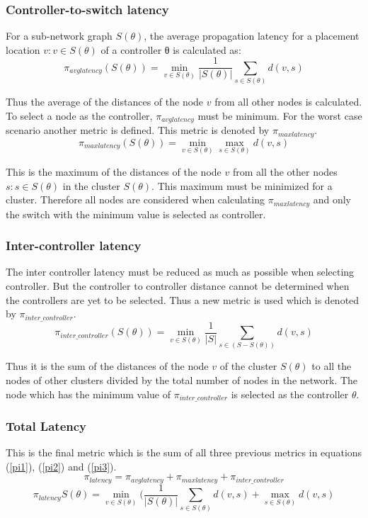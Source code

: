 \documentclass[10pt]{extarticle}
\begin{document}
	\subsubsection{Controller-to-switch latency}
	For a sub-network graph $S(\theta)$, the average propagation latency for a placement location $v:v\in S(\theta)$ of a controller θ is calculated as:
	\begin{equation}	\label{pi1}
	\pi_{avglatency}(S(\theta)) = \min_{v\in S(\theta)} \frac{1}{|S(\theta)|} \sum_{s\in S(\theta)}d(v,s)
	\end{equation}
	
	Thus the average of the distances of the node $v$ from all other nodes is calculated. To select a node as the controller, $\pi_{avglatency}$ must be minimum.
	For the worst case scenario another metric is defined. This metric is denoted by $\pi_{maxlatency}$.
	\begin{equation}	\label{pi2}
	\pi_{maxlatency}(S(\theta)) = \min_{v\in S(\theta)} \max_{s\in S(\theta)}d(v,s)
	\end{equation}
	
	This is the maximum of the distances of the node $v$ from all the other nodes $s:s\in S(\theta)$ in the cluster $S(\theta)$. This maximum must be minimized for a cluster. Therefore all nodes are considered when calculating $\pi_{maxlatency}$ and only the switch with the minimum value is selected as controller.
	
	\subsubsection{Inter-controller latency}
	The inter controller latency must be reduced as much as possible when selecting controller. But the controller to controller distance cannot be determined when the controllers are yet to be selected. Thus a new metric is used which is denoted by $\pi_{inter\_controller}$.
	\begin{equation}	\label{pi3}
	\pi_{inter\_controller}(S(\theta)) = \min_{v\in S(\theta)} \frac{1}{|S|} \sum_{s\in (S-S(\theta))}d(v,s)
	\end{equation}
	
	Thus it is the sum of the distances of the node $v$ of the cluster $S(\theta)$ to all the nodes of other clusters divided by the total number of nodes in the network. The node which has the minimum value of $\pi_{inter\_controller}$ is selected as the controller $\theta$.
	
	\subsubsection{Total Latency}
	This is the final metric which is the sum of all three previous metrics in equations (\ref{pi1}), (\ref{pi2}) and (\ref{pi3}).
	\begin{equation}
	\pi_{latency} = \pi_{avglatency} + \pi_{maxlatency} + \pi_{inter\_controller}
	\end{equation}	\label{pi4}
	\[\pi_{latency}S(\theta)=\min_{v\in S(\theta)}(\frac{1}{|S(\theta)|} \sum_{s\in S(\theta)}d(v,s) + \max_{s\in S(\theta)}d(v,s)\]
	
\end{document}

